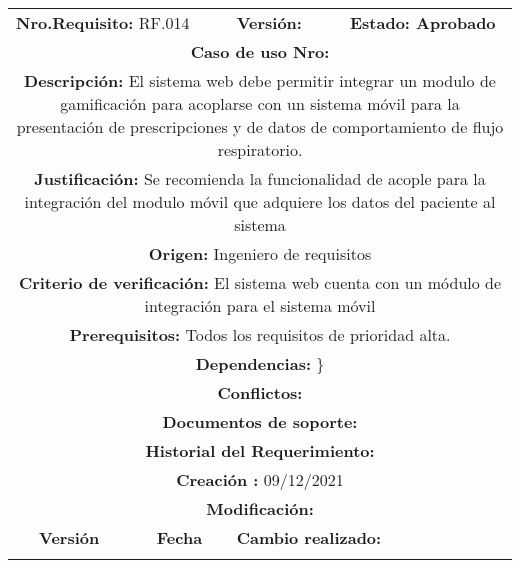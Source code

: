 \begin{center}
\begin{tabular}{|c|c|p{4cm}|p{4cm}|}
            \hline
            \rowcolor{red} \multicolumn{4}{|c|}{\textbf{Prioridad:} Alta}  \\
            \hline
            \multicolumn{2}{|l}{\textbf{Nro.Requisito: }RF.014} & \multicolumn{1}{|l}{\textbf{Versión: }} & \multicolumn{1}{|l|}{\textbf{Estado: Aprobado}} \\
            \multicolumn{4}{|p{13cm}|}{\textbf{Caso de uso Nro: }}  \\
            \hline
            \multicolumn{4}{|p{13cm}|}{\textbf{Descripción: } El sistema web debe permitir integrar un modulo de gamificación para acoplarse con un sistema móvil para la presentación de prescripciones y de datos de comportamiento de flujo respiratorio. } \\
            \multicolumn{4}{|p{13cm}|}{\textbf{Justificación: } Se recomienda la funcionalidad de acople para la integración del modulo móvil que adquiere los datos del paciente  al sistema} \\ 
            \multicolumn{4}{|p{13cm}|}{\textbf{Origen: }Ingeniero de requisitos}  \\
            \multicolumn{4}{|p{13cm}|}{\textbf{Criterio de verificación: } El sistema web cuenta con un módulo de integración para el sistema móvil} \\
            \hline
            \multicolumn{4}{|p{13cm}|}{\textbf{Prerequisitos: } Todos los requisitos de prioridad alta. }\\
            \hline \multicolumn{4}{|p{12cm}|}{\textbf{Dependencias: }
               \}
              }  \\
            \multicolumn{4}{|p{12cm}|}{\textbf{Conflictos: }}  \\
            \hline
            \multicolumn{4}{|p{12cm}|}{\textbf{Documentos de soporte: }}  \\
            \hline
            \multicolumn{4}{|p{12cm}|}{\textbf{Historial del Requerimiento: }}  \\
            \multicolumn{4}{|p{12cm}|}{\textbf{Creación : }09/12/2021}  \\
            \multicolumn{4}{|p{12cm}|}{\textbf{Modificación: }}  \\
             \textbf{Versión} & \textbf{Fecha} & \multicolumn{2}{p{8cm}|}{\textbf{Cambio realizado:}} \\
            \hline
                 & &   \multicolumn{2}{p{8cm}|}{}
              \\
            \hline
\end{tabular}




\end{center}
